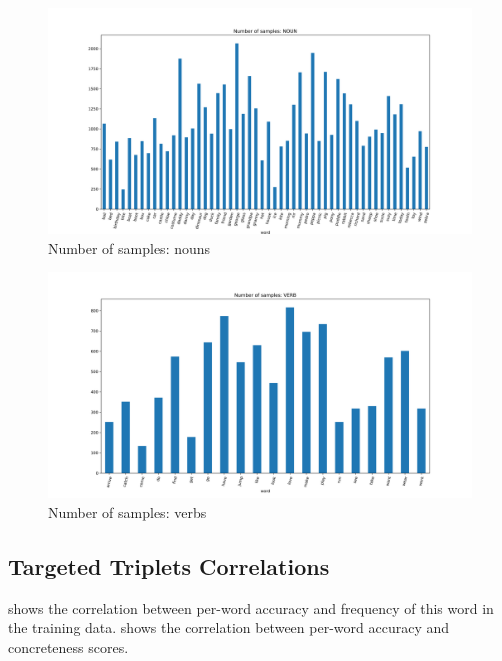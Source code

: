 \begin{figure}
  \centering
  \includegraphics[width=\textwidth]{results/targeted_triplets/num_samples_NOUN_word.png}
  \caption{Number of samples: nouns}
  \label{fig:num_samples_NOUN_word}
\end{figure}

\begin{figure}
  \centering
  \includegraphics[width=\textwidth]{results/targeted_triplets/num_samples_VERB_word.png}
  \caption{Number of samples: verbs}
  \label{fig:num_samples_VERB_word}
\end{figure}

\subsection{Targeted Triplets Correlations}\label{app:targeted_triplets_correlations}

 shows the correlation between per-word accuracy and frequency of this word in the training data.
 shows the correlation between per-word accuracy and concreteness scores.






